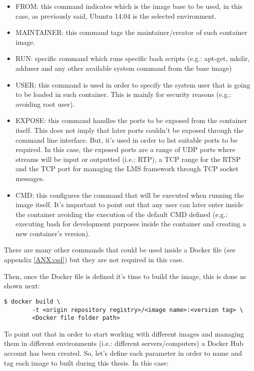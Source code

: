 \begin{itemize}
\item FROM: this command indicates which is the image base to be used, in this case, as previously said, Ubuntu 14.04 is the selected environment.
\item MAINTAINER: this command tags the maintainer/creator of such container image.
\item RUN: specific command which runs specific bash scripts (e.g.: apt-get, mkdir, adduser and any other available system command from the base image)
\item USER: this command is used in order to specify the system user that is going to be loaded in such container. This is mainly for security reasons (e.g.: avoiding root user).
\item EXPOSE: this command handles the ports to be exposed from the container itself. This does not imply that later ports couldn't be exposed through the command line interface. But, it's used in order to list suitable ports to be required. In this case, the exposed ports are a range of UDP ports where streams will be input or outputted (i.e.: RTP), a TCP range for the RTSP and the TCP port for managing the LMS framework through TCP socket messages. 
\item CMD: this configures the command that will be executed when running the image itself. It's important to point out that any user can later enter inside the container avoiding the execution of the default CMD defined (e.g.: executing bash for development purposes inside the container and creating a new container's version).
\end{itemize}

There are many other commands that could be used inside a Docker file (see appendix \ref{ANX:csd}) but they are not required in this case.

Then, once the Docker file is defined it's time to build the image, this is done as shown next:

\begin{verbatim}
$ docker build \
		-t <origin repository registry>/<image name>:<version tag> \
		<Docker file folder path>
\end{verbatim}

To point out that in order to start working with different images and managing them in different environments (i.e.: different servers/computers) a Docker Hub account has been created. So, let's define each parameter in order to name and tag each image to built during this thesis. In this case:

